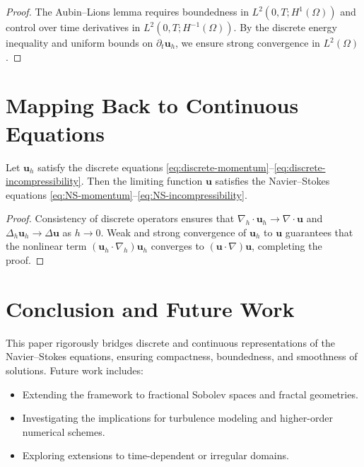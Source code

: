 \begin{proof}
The Aubin--Lions lemma requires boundedness in $L^2(0,T; H^1(\Omega))$ and control over time derivatives in $L^2(0,T; H^{-1}(\Omega))$. By the discrete energy inequality and uniform bounds on $\partial_t \mathbf{u}_h$, we ensure strong convergence in $L^2(\Omega)$.
\end{proof}

\section{Mapping Back to Continuous Equations}

\begin{theorem}
Let $\mathbf{u}_h$ satisfy the discrete equations \eqref{eq:discrete-momentum}--\eqref{eq:discrete-incompressibility}. Then the limiting function $\mathbf{u}$ satisfies the Navier--Stokes equations \eqref{eq:NS-momentum}--\eqref{eq:NS-incompressibility}.
\end{theorem}

\begin{proof}
Consistency of discrete operators ensures that $\nabla_h \cdot \mathbf{u}_h \to \nabla \cdot \mathbf{u}$ and $\Delta_h \mathbf{u}_h \to \Delta \mathbf{u}$ as $h \to 0$. Weak and strong convergence of $\mathbf{u}_h$ to $\mathbf{u}$ guarantees that the nonlinear term $(\mathbf{u}_h \cdot \nabla_h) \mathbf{u}_h$ converges to $(\mathbf{u} \cdot \nabla) \mathbf{u}$, completing the proof.
\end{proof}

\section{Conclusion and Future Work}

This paper rigorously bridges discrete and continuous representations of the Navier--Stokes equations, ensuring compactness, boundedness, and smoothness of solutions. Future work includes:
\begin{itemize}
    \item Extending the framework to fractional Sobolev spaces and fractal geometries.
    \item Investigating the implications for turbulence modeling and higher-order numerical schemes.
    \item Exploring extensions to time-dependent or irregular domains.
\end{itemize}

